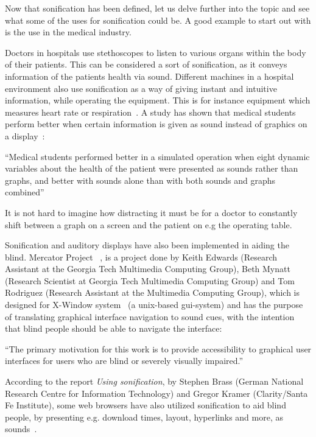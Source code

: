Now that sonification has been defined, let us delve further into the topic and see what some of the uses for sonification could be. 
A good example to start out with is the use in the medical industry.

Doctors in hospitals use stethoscopes to listen to various organs within the body of their patients. 
This can be considered a sort of sonification, as it conveys information of the patients health via sound. 
Different machines in a hospital environment also use sonification as a way of giving instant and intuitive information, while operating the equipment. 
This is for instance equipment which measures heart rate or respiration~\cite*{Sanderson2006}.
A study has shown that medical students perform better when certain information is given as sound instead of graphics on a display~\cite*[pp.23]{Barrass1999}:

\enquote{Medical students performed better in a simulated operation when eight dynamic variables about the health of the patient were presented as sounds rather than graphs, and better with sounds alone than with both sounds and graphs combined}~\cite*[pp.23]{Barrass1999}

It is not hard to imagine how distracting it must be for a doctor to constantly shift between a graph on a screen and the patient on e.g the operating table.


Sonification and auditory displays have also been implemented in aiding the blind. 
Mercator Project ~\cite*{Edwards2013}, is a project done by Keith Edwards (Research Assistant at the Georgia Tech Multimedia Computing Group), Beth Mynatt (Research Scientist at Georgia Tech Multimedia Computing Group) and Tom Rodriguez (Research Assistant at the Multimedia Computing Group), which is designed for X-Window system~\cite*{x2014} (a unix-based gui-system) and has the purpose of translating graphical interface navigation to sound cues, with the intention that blind people should be able to navigate the interface:

\enquote{The primary motivation for this work is to provide accessibility to graphical user interfaces for users who are blind or severely visually impaired.}~\cite*[p.1]{Edwards2013}

According to the report \emph{Using sonification}, by Stephen Brass (German National Research Centre for Information Technology) and Gregor Kramer (Clarity/Santa Fe Institute), some web browsers have also utilized sonification to aid blind people, by presenting e.g. download times, layout, hyperlinks and more, as sounds~\cite*[pp.24]{Barrass1999}.

